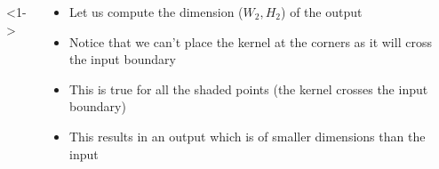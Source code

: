 \begin{frame}
	\begin{columns}
		\begin{overlayarea}{\textwidth}{\textheight}
			\begin{minipage}[t]{0.5\textwidth}
				
				
			\end{minipage}
			\begin{minipage}[t]{0.5\textwidth}
				\vspace{30mm}
			\end{minipage}
			              
		\end{overlayarea}
		        
		<1->
		\begin{overlayarea}{\textwidth}{\textheight}
			\footnotesize{
				\begin{itemize}
					\justifying
					\item<1-> Let us compute the dimension ($W_2, H_2$) of the output
					\item<8-> Notice that we can't place the kernel at the corners as it will cross the input boundary
					\item<10-> This is true for all the shaded points (the kernel crosses the input boundary)
					\item<11-> This results in an output which is of smaller dimensions than the input
				\end{itemize}}
		\end{overlayarea}
	\end{columns}
\end{frame}

